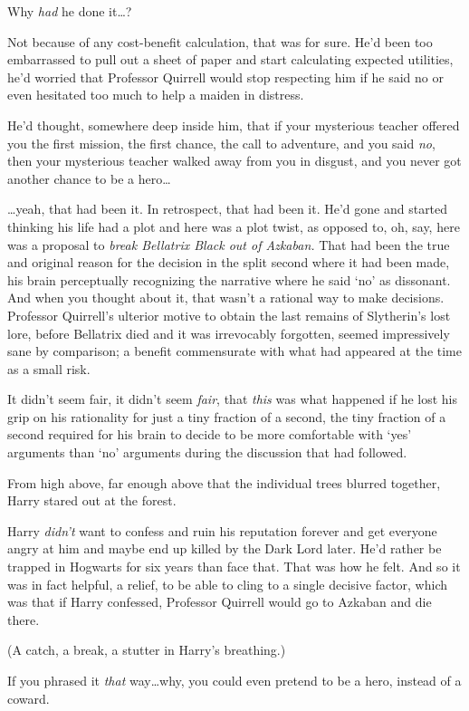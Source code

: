 Why \emph{had} he done it…?

Not because of any cost-benefit calculation, that was for sure. He’d been too embarrassed to pull out a sheet of paper and start calculating expected utilities, he’d worried that Professor Quirrell would stop respecting him if he said no or even hesitated too much to help a maiden in distress.

He’d thought, somewhere deep inside him, that if your mysterious teacher offered you the first mission, the first chance, the call to adventure, and you said \emph{no}, then your mysterious teacher walked away from you in disgust, and you never got another chance to be a hero…

…yeah, that had been it. In retrospect, that had been it. He’d gone and started thinking his life had a plot and here was a plot twist, as opposed to, oh, say, here was a proposal to \emph{break Bellatrix Black out of Azkaban.} That had been the true and original reason for the decision in the split second where it had been made, his brain perceptually recognizing the narrative where he said ‘no’ as dissonant. And when you thought about it, that wasn’t a rational way to make decisions. Professor Quirrell’s ulterior motive to obtain the last remains of Slytherin’s lost lore, before Bellatrix died and it was irrevocably forgotten, seemed impressively sane by comparison; a benefit commensurate with what had appeared at the time as a small risk.

It didn’t seem fair, it didn’t seem \emph{fair}, that \emph{this} was what happened if he lost his grip on his rationality for just a tiny fraction of a second, the tiny fraction of a second required for his brain to decide to be more comfortable with ‘yes’ arguments than ‘no’ arguments during the discussion that had followed.

From high above, far enough above that the individual trees blurred together, Harry stared out at the forest.

Harry \emph{didn’t} want to confess and ruin his reputation forever and get everyone angry at him and maybe end up killed by the Dark Lord later. He’d rather be trapped in Hogwarts for six years than face that. That was how he felt. And so it was in fact helpful, a relief, to be able to cling to a single decisive factor, which was that if Harry confessed, Professor Quirrell would go to Azkaban and die there.

(A catch, a break, a stutter in Harry’s breathing.)

If you phrased it \emph{that} way…why, you could even pretend to be a hero, instead of a coward.

